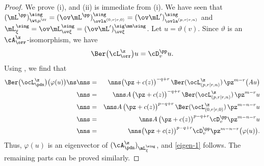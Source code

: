 \documentclass[11pt, reqno]{amsart}
\theoremstyle{definition}
\theoremstyle{remark}
\numberwithin{equation}{section}
\begin{document}
\begin{proof}
We prove (i), and (ii) is immediate from (i).
We have seen that $(\mL^\pp)_{\wt\mu^\rr}^\sing=(\ov\mL^\pp)_{\ovla^{(0, r|r, 0)}}^\sing=(\ov\mL^\prime)_{\ovla^{(p, r|r, n)}}^\sing$ and $\mL^\sing_{\xi}=\ov\mL_{\ov\xi}^\sing=(\ov\mL^\prime)_{\ov\xi}^{\sig\mm\sing}$.
Let $u=\vartheta(v)$.
Since $\vartheta$ is an $\cA_\orr^\z$-isomorphism, we have
$$
\Ber \big(\cL^\z_\orr \big) u=\cD^\pp_v u.
$$
Using , we find that
\begin{eqnarray*}
\Ber \big(\ocL_\pdn^\z \big) \big( \varphi (u) \big)
\ns \nns &=& \nns \big(\pz+c(z) \big)^{-q+r} \, \Ber(\ocL^\z_{(p, r|r,n)}) \, \pz^{m-r} \big( A u \big) \\
\nns &=& \nns A \,  \big(\pz+c(z) \big)^{-q+r} \, \Ber(\ocL^\z_{(p, r|r,n)}) \, \pz^{m-r} u \\
\nns &=& \nns A \,  \big(\pz+c(z) \big)^{p-q+r} \, \Ber(\ocL^\z_{(0, r|r,0)}) \, \pz^{m-n-r} u \\
\nns &=& \nns A \, \big(\pz+c(z) \big)^{p-q+r}  \cD^\pp_v  \pz^{m-n-r} u \\
\nns &=& \nns  \big(\pz+c(z) \big)^{p-q+r}  \cD^\pp_v  \pz^{m-n-r}  \big(\varphi (u) \big).
\end{eqnarray*}
Thus, $\varphi(u)$ is an eigenvector of $(\cA_\pdn^\z)_{\mL^\sing_{\xi}}$, and \eqref{eigen-1} follows.
The remaining parts can be proved similarly.
\end{proof}
\end{document}
